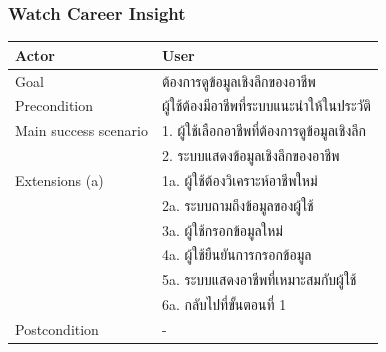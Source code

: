 \subsubsection{Watch Career Insight}
\begin{table}[H]
    \begin{tabularx}{\textwidth}{|l|X|} \hline
        Actor                 & User                  \\ \hline
        Goal                  & ต้องการดูข้อมูลเชิงลึกของอาชีพ         \\ \hline
        Precondition          & ผู้ใช้ต้องมีอาชีพที่ระบบแนะนำให้ในประวัติ          \\ \hline
        Main success scenario & 1. ผู้ใช้เลือกอาชีพที่ต้องการดูข้อมูลเชิงลึก \\
        & 2. ระบบแสดงข้อมูลเชิงลึกของอาชีพ     \\ \hline
        Extensions (a)        & 1a. ผู้ใช้ต้องวิเคราะห์อาชีพใหม่        \\
        & 2a. ระบบถามถึงข้อมูลของผู้ใช้         \\
        & 3a. ผู้ใช้กรอกข้อมูลใหม่              \\
        & 4a. ผู้ใช้ยืนยันการกรอกข้อมูล          \\
        & 5a. ระบบแสดงอาชีพที่เหมาะสมกับผู้ใช้   \\
        & 6a. กลับไปที่ขั้นตอนที่ 1              \\ \hline
        Postcondition          & -                               \\ \hline
    \end{tabularx}
\end{table}



